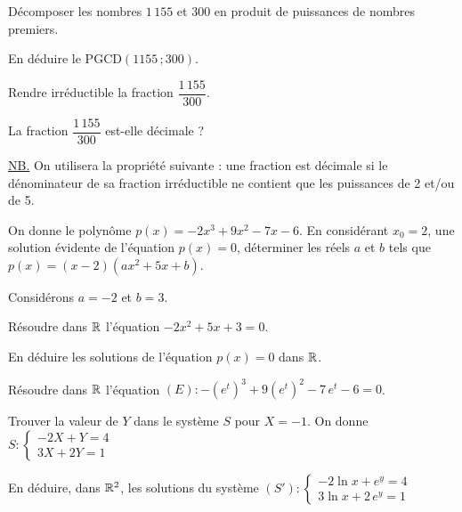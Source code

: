 \documentclass[11pt]{article}
\begin{document}

\begin{questions}
  \item \begin{sousq}
    \item Décomposer les nombres $1\,155$ et $300$ en produit de puissances de nombres premiers.
    \item En déduire le $\mathrm{PGCD}(1155\,;300)$.
  \end{sousq}
  \item Rendre irréductible la fraction $\dfrac{1\,155}{300}$.
  \item La fraction $\dfrac{1\,155}{300}$ est-elle décimale ?

  \underline{NB.} On utilisera la propriété suivante : une fraction est décimale si le dénominateur de sa fraction irréductible ne contient que les puissances de 2 et/ou de 5.
\end{questions}

\begin{questions}
  \item On donne le polynôme $p(x) = -2x^3 + 9x^2 - 7x - 6$. En considérant $x_0 = 2$, une solution évidente de l'équation $p(x) = 0$, déterminer les réels $a$ et $b$ tels que $p(x) = (x - 2)(ax^2 + 5x + b)$.
  \item Considérons $a = -2$ et $b = 3$.
  \begin{sousq}
    \item Résoudre dans $\mathbb{R}$ l'équation $-2x^2 + 5x + 3 = 0$.
    \item En déduire les solutions de l'équation $p(x) = 0$ dans $\mathbb{R}$.
  \end{sousq}
  \item Résoudre dans $\mathbb{R}$ l'équation $(E) : -(e^{t})^3 + 9(e^{t})^2 - 7\,e^{t} - 6 = 0$.
  \item \begin{sousq}
    \item Trouver la valeur de $Y$ dans le système $S$ pour $X = -1$. On donne $S : \begin{cases} -2X + Y = 4 \\ 3X + 2Y = 1 \end{cases}$
    \item En déduire, dans $\mathbb{R}^2$, les solutions du système $(S') : \begin{cases} -2\ln x + e^{y} = 4 \\ 3\ln x + 2\,e^{y} = 1 \end{cases}$
  \end{sousq}
\end{questions}
\end{document}
